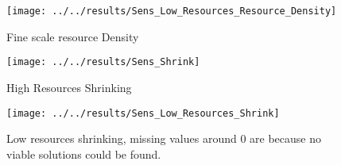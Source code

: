 \begin{figure}
	\centering
	\texttt{[image: ../../results/Sens\_Low\_Resources\_Resource\_Density]}
	\caption{Fine scale resource Density}
	\label{fig:senslowresourcesresourcedensity}
\end{figure}

\begin{figure}
	\centering
	\texttt{[image: ../../results/Sens\_Shrink]}
	\caption{High Resources Shrinking}
	\label{fig:sensshrink}
\end{figure}

\begin{figure}
	\centering
	\texttt{[image: ../../results/Sens\_Low\_Resources\_Shrink]}
	\caption{Low resources shrinking, missing values around 0 are because no viable solutions could be found.}
	\label{fig:senslowresourcesshrink}
\end{figure}




	

